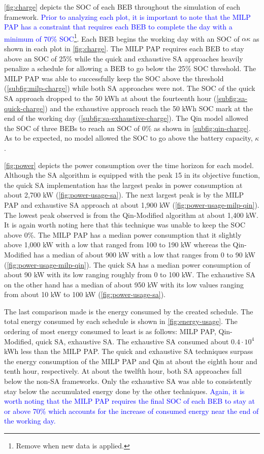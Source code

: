 \documentclass[11pt,a4paper,final]{article}
\begin{document}
\ref{fig:charge} depicts the SOC of each BEB throughout the simulation of each framework.
\textcolor{blue}{Prior to analyzing each plot, it is important to note that the MILP PAP has a constraint that requires each BEB to complete the day with a minimum of 70\% SOC}\footnote{Remove when new data is applied.}. Each BEB begins the working day with an SOC of
\(\alpha\kappa\) as shown in each plot in \ref{fig:charge}. The MILP PAP requires each BEB to stay above an SOC of 25\% while the
quick and exhaustive SA approaches heavily penalize a schedule for allowing a BEB to go below the 25\% SOC threshold. The
MILP PAP was able to successfully keep the SOC above the threshold (\ref{subfig:milp-charge}) while both SA approaches
were not. The SOC of the quick SA approach dropped to the 50 kWh at about the fourteenth hour
(\ref{subfig:sa-quick-charge}) and the exhaustive approach reach the 50 kWh SOC mark at the end of the working day
(\ref{subfig:sa-exhaustive-charge}). The Qin model allowed the SOC of three BEBs to reach an SOC of 0\% as shown in
\ref{subfig:qin-charge}. As to be expected, no model allowed the SOC to go above the battery capacity, \(\kappa\).

\ref{fig:power} depicts the power consumption over the time horizon for each model. Although the SA algorithm is
equipped with the peak 15 in its objective function, the quick SA implementation has the largest peaks in power
consumption at about 2,700 kW (\ref{fig:power-usage-sa}). The next largest peak is by the MILP PAP and exhaustive SA
approach at about 1,900 kW (\ref{fig:power-usage-milp-qin}). The lowest peak observed is from the Qin-Modified algorithm
at about 1,400 kW. It is again worth noting here that this technique was unable to keep the SOC above 0\%. The MILP PAP
has a median power consumption that it slightly above 1,000 kW with a low that ranged from 100 to 190 kW whereas the
Qin-Modified has a median of about 900 kW with a low that ranges from 0 to 90 kW (\ref{fig:power-usage-milp-qin}). The
quick SA has a median power consumption of about 90 kW with its low ranging roughly from 0 to 100 kW. The exhaustive SA
on the other hand has a median of about 950 kW with its low values ranging from about 10 kW to 100 kW
(\ref{fig:power-usage-sa}).

The last comparison made is the energy consumed by the created schedule. The total energy consumed by each schedule is
shown in \ref{fig:energy-usage}. The ordering of most energy consumed to least is as follows: MILP PAP, Qin-Modified,
quick SA, exhaustive SA. The exhaustive SA consumed about \(0.4 \cdot 10^4\) kWh less than the MILP PAP. The quick and
exhaustive SA techniques surpass the energy consumption of the MILP PAP and Qin at about the eighth hour and tenth hour,
respectively. At about the twelfth hour, both SA approaches fall below the non-SA frameworks. Only the exhaustive SA was
able to consistently stay below the accumulated energy done by the other techniques. \textcolor{blue}{Again, it is worth noting that the MILP PAP requires the final SOC of each BEB to stay at or above 70\% which accounts for the increase of consumed energy near the end of the working day.}
\end{document}
